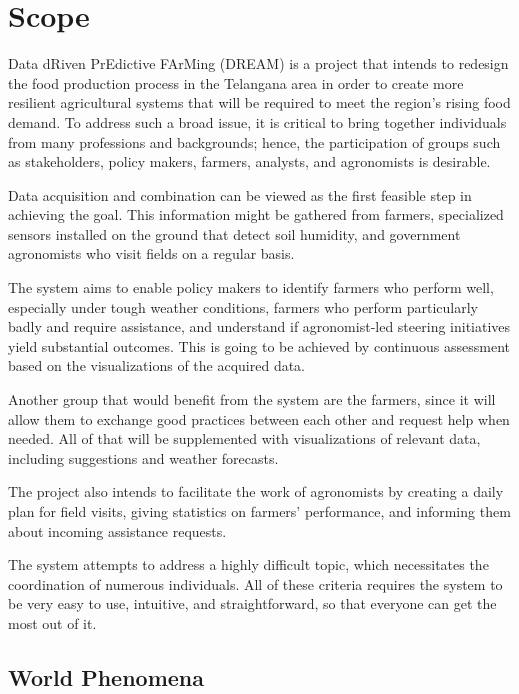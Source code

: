 \section{Scope}

Data dRiven PrEdictive FArMing (DREAM) is a project that intends to redesign the food production process in the Telangana area in order to create more resilient agricultural systems that will be required to meet the region's rising food demand. To address such a broad issue, it is critical to bring together individuals from many professions and backgrounds; hence, the participation of groups such as stakeholders, policy makers, farmers, analysts, and agronomists is desirable.

Data acquisition and combination can be viewed as the first feasible step in achieving the goal. This information might be gathered from farmers, specialized sensors installed on the ground that detect soil humidity, and government agronomists who visit fields on a regular basis.

The system aims to enable policy makers to identify farmers who perform well, especially under tough weather conditions, farmers who perform particularly badly and require assistance, and understand if agronomist-led steering initiatives yield substantial outcomes. This is going to be achieved by continuous assessment based on the visualizations of the acquired data.

Another group that would benefit from the system are the farmers, since it will allow them to exchange good practices between each other and request help when needed. All of that will be supplemented with visualizations of relevant data, including suggestions and weather forecasts.

The project also intends to facilitate the work of agronomists by creating a daily plan for field visits, giving statistics on farmers' performance, and informing them about incoming assistance requests.

The system attempts to address a highly difficult topic, which necessitates the coordination of numerous individuals. All of these criteria requires the system to be very easy to use, intuitive, and straightforward, so that everyone can get the most out of it.

\subsection{World Phenomena}

